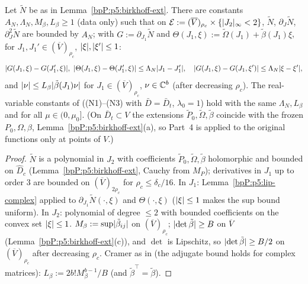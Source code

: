 \begin{lemma}\label{bpP:p5:freq-data}
Let $\tilde N$ be as in Lemma~\ref{bpP:p5:birkhoff-ext}. There are constants $A_N,\Lambda_N,M_\beta,L_\beta\ge1$ (data only) such that on $\mathcal E:=(\overline V)_{\rho_c}\times\{\lvert J_2\rvert_\infty<2\}$, $\tilde N$, $\partial_{J}\tilde N$, $\partial^2_J\tilde N$ are bounded by $A_N$; with $G:=\partial_{J_1}\tilde N$ and $\Theta(J_1,\xi):=\tilde\Omega(J_1)+\tilde\beta(J_1)\xi$, for $J_1,J_1'\in(\overline V)_{\rho_c}$, $\lvert \xi\rvert,\lvert \xi'\rvert\le1$:
\[\abs{G(J_1,\xi)-G(J_1',\xi)},\ \abs{\Theta(J_1,\xi)-\Theta(J_1',\xi)}\le\Lambda_N\abs{J_1-J_1'},\quad\abs{G(J_1,\xi)-G(J_1,\xi')}\le\Lambda_N\abs{\xi-\xi'},\]
and $\lvert \nu\rvert\le L_\beta\lvert \tilde\beta(J_1)\nu\rvert$ for $J_1\in(\overline V)_{\rho_c}$, $\nu\in\mathbb{C}^b$ (after decreasing $\rho_c$). The real-variable constants of  ((N1)--(N3) with $\bar D=\bar D_t$, $\lambda_0=1$) hold with the same $\Lambda_N,L_\beta$ and for all $\mu\in(0,\mu_0]$. (On $\bar D_t\subset V$ the extensions $\tilde P_0,\tilde\Omega,\tilde\beta$ coincide with the frozen $P_0,\Omega,\beta$, Lemma~\ref{bpP:p5:birkhoff-ext}(a), so Part~4 is applied to the original functions only at points of $V$.)
\end{lemma}
\begin{proof}
\label{stepP:p5:fd-bd} $\tilde N$ is a polynomial in $J_2$ with coefficients $\tilde P_0,\tilde\Omega,\tilde\beta$ holomorphic and bounded on $\hat D_c$ (Lemma~\ref{bpP:p5:birkhoff-ext}, Cauchy from $M_P$); derivatives in $J_1$ up to order $3$ are bounded on $(\overline V)_{2\rho_c}$ for $\rho_c\le\delta_c/16$.
\label{stepP:p5:fd-lip} In $J_1$: Lemma~\ref{bpP:p5:lip-complex} applied to $\partial_{J_1}\tilde N(\cdot,\xi)$ and $\Theta(\cdot,\xi)$ ($\lvert \xi\rvert\le1$ makes the sup bound uniform). In $J_2$: polynomial of degree $\le2$ with bounded coefficients on the convex set $\lvert \xi\rvert\le1$.
\label{stepP:p5:fd-beta} $M_\beta:=\sup\lvert \tilde\beta_{ij}\rvert$ on $(\overline V)_{\rho_c}$; $\lvert \det\tilde\beta\rvert\ge B$ on $\overline V$ (Lemma~\ref{bpP:p5:birkhoff-ext}(c)), and $\det$ is Lipschitz, so $\lvert \det\tilde\beta\rvert\ge B/2$ on $(\overline V)_{\rho_c}$ after decreasing $\rho_c$. Cramer as in  (the adjugate bound holds for complex matrices): $L_\beta:=2b!M_\beta^{b-1}/B$ (and $\tilde\beta^{\top}=\tilde\beta$).
\end{proof}

